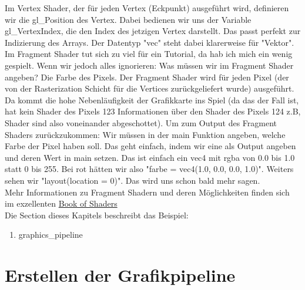 \documentclass[11pt,a4paper]{report}
\begin{document}
\newpage
Im Vertex Shader, der für jeden Vertex (Eckpunkt) ausgeführt wird, definieren wir die gl\_Position des Vertex. Dabei bedienen wir uns der Variable gl\_VertexIndex, die den Index des jetzigen Vertex darstellt. Das passt perfekt zur Indizierung des Arrays. Der Datentyp "vec" steht dabei klarerweise für "Vektor".\\
Im Fragment Shader tut sich zu viel für ein Tutorial, da hab ich mich ein wenig gespielt. Wenn wir jedoch alles ignorieren: Was müssen wir im Fragment Shader angeben? Die Farbe des Pixels. Der Fragment Shader wird für jeden Pixel (der von der Rasterization Schicht für die Vertices zurückgeliefert wurde) ausgeführt. Da kommt die hohe Nebenläufigkeit der Grafikkarte ins Spiel (da das der Fall ist, hat kein Shader des Pixels 123 Informationen über den Shader des Pixels 124 z.B, Shader sind also voneinander abgeschottet). Um zum Output des Fragment Shaders zurückzukommen: Wir müssen in der main Funktion angeben, welche Farbe der Pixel haben soll. Das geht einfach, indem wir eine als Output angeben und deren Wert in main setzen. Das ist einfach ein vec4 mit rgba von 0.0 bis 1.0 statt 0 bis 255. Bei rot hätten wir also "farbe = vec4(1.0, 0.0, 0.0, 1.0)". Weiters sehen wir "layout(location = 0)". Das wird uns schon bald mehr sagen.\\
Mehr Informationen zu Fragment Shadern und deren Möglichkeiten finden sich im exzellenten \href{https://thebookofshaders.com/}{Book of Shaders}\\
Die Section dieses Kapitels beschreibt das Beispiel:
\begin{enumerate}
	\item{graphics\_pipeline}
\end{enumerate}

\section{Erstellen der Grafikpipeline}
\end{document}
